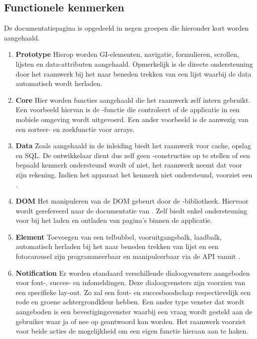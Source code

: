 \subsection{Functionele kenmerken}
De documentatiepagina is opgedeeld in negen groepen die hieronder kort worden aangehaald.

\begin{enumerate}

\item \textbf{Prototype } 
Hierop worden GI-elementen, navigatie, formulieren, scrollen, lijsten en data-attributen aangehaald. 
Opmerkelijk is de directe ondersteuning door het raamwerk bij het naar beneden trekken van een lijst waarbij de data automatisch wordt herladen.

\item \textbf{Core }
Hier worden functies aangehaald die het raamwerk zelf intern gebruikt.
Een voorbeeld hiervan is de -functie die controleert of de applicatie in een mobiele omgeving wordt uitgevoerd.
Een ander voorbeeld is de aanwezig van een sorteer- en zoekfunctie voor arrays.

\item \textbf{Data }
Zoals aangehaald in de inleiding biedt het raamwerk  voor cache, opslag en SQL.
De ontwikkelaar dient dus zelf geen -constructies op te stellen of een bepaald kenmerk ondersteund wordt of niet, het raamwerk neemt dat voor zijn rekening.
Indien het apparaat het kenmerk niet ondersteund, voorziet \lungo{} een .

\item \textbf{DOM }
Het manipuleren van de DOM gebeurt door de \quo{}-bibliotheek.
Hiervoor wordt gerefereerd naar de documentatie van \quo{}.
Zelf biedt \lungo{} enkel ondersteuning voor  bij het laden en ontladen van pagina's binnen de applicatie.

\item \textbf{Element }
Toevoegen van een telbubbel, vooruitgangsbalk, laadbalk, automatisch herladen bij het naar beneden trekken van lijst en een fotocarousel zijn programmeerbaar en manipuleerbaar via de \lungo{} API vanuit \js{}. 

\item \textbf{Notification }
Er worden standaard verschillende dialoogvensters aangeboden voor fout-, succes- en infomeldingen.
Deze dialoogvensters zijn voorzien van een specifieke lay-out.
Zo zal een fout- en succesboodschap respectievelijk een rode en groene achtergrondkleur hebben.
Een ander type venster dat wordt aangeboden is een bevestigingsvenster waarbij een vraag wordt gesteld aan de gebruiker waar ja of nee op geantwoord kan worden.
Het raamwerk voorziet voor beide acties de mogelijkheid om een eigen functie hieraan aan te haken.
 

\end{enumerate}
